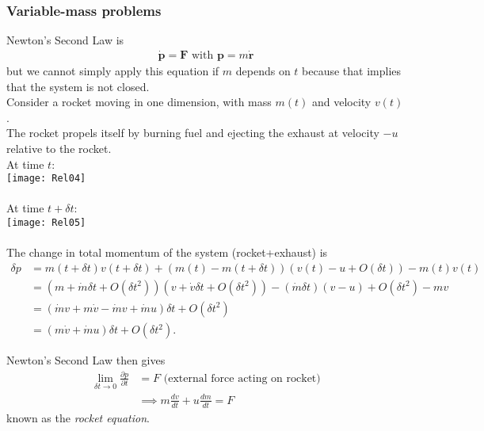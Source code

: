 \documentclass[a4paper]{article}
\begin{document}
\subsubsection{Variable-mass problems}
Newton's Second Law is\\
\begin{equation*}
\begin{aligned}
\dot{\mathbf{p}} = \mathbf{F} \text{ with } \mathbf{p} = m \dot{\mathbf{r}}
\end{aligned}
\end{equation*}
but we cannot simply apply this equation if $m$ depends on $t$ because that implies that the system is not closed.\\
Consider a rocket moving in one dimension, with mass $m\left(t\right)$ and velocity $v\left(t\right)$.\\
The rocket propels itself by burning fuel and ejecting the exhaust at velocity $-u$ relative to the rocket.\\
At time $t$:\\
\texttt{[image: Rel04]}\\\\
At time $t+\delta t$:\\
\texttt{[image: Rel05]}\\\\
The change in total momentum of the system (rocket+exhaust) is
\begin{equation*}
\begin{aligned}
\delta p &= m\left(t+\delta t\right) v\left(t+\delta t\right) + \left(m\left(t\right)-m\left(t+\delta t\right)\right)\left(v\left(t\right)-u+O\left(\delta t\right)\right)-m\left(t\right)v\left(t\right)\\
&=\left(m+\dot{m}\delta t+O\left(\delta t^2\right)\right)\left(v+\dot{v}\delta t+O\left(\delta t^2\right)\right) - \left(\dot{m} \delta t\right)\left(v-u\right) + O\left(\delta t^2\right) - mv\\
&=\left(\dot{m}v+m\dot{v}-\dot{m}v+\dot{m}u\right)\delta t + O\left(\delta t^2\right)\\
&=\left(m\dot{v}+\dot{m}u\right)\delta t + O\left(\delta t^2\right).
\end{aligned}
\end{equation*}

Newton's Second Law then gives
\begin{equation*}
\begin{aligned}
\lim_{\delta t\to 0} \frac{\partial p}{\partial t} &= F \text{ (external force acting on rocket)}\\
& \implies m\frac{dv}{dt} + u\frac{dm}{dt} = F
\end{aligned}
\end{equation*}
known as the \emph{rocket equation}.
\end{document}

